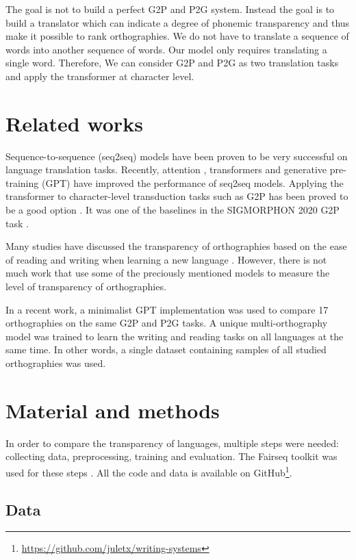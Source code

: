 \documentclass[11pt,a4paper]{article}
\begin{document}
The goal is not to build a perfect G2P and P2G system. Instead the goal is to build a translator which can indicate a degree of phonemic transparency and thus make it possible to rank orthographies. We do not have to translate a
sequence of words into another sequence of words. Our model only requires translating a single word. Therefore, We can consider G2P and P2G as two translation tasks and apply the transformer at character level.

\section{Related works}

Sequence-to-sequence (seq2seq) models have been proven to be very successful on language translation tasks. Recently, attention \cite{bahdanau2016neural}, transformers \cite{vaswani2017attention} and generative pre-training (GPT) \cite{Radford2018ImprovingLU} have improved the performance of seq2seq models. Applying the transformer to character-level transduction tasks such as G2P has been proved to be a good option \cite{wu2021applying}. It was one of the baselines in the SIGMORPHON 2020 G2P task \cite{gorman-etal-2020-sigmorphon}.

Many studies have discussed the transparency of orthographies based on the ease of reading and writing when learning a new language \cite{borleffs2017measuring}. However, there is not much work that use some of the preciously mentioned models to measure the level of transparency of orthographies.

In a recent work, a minimalist GPT implementation was used to compare 17 orthographies \cite{marjou2021oteann} on the same G2P and P2G tasks. A unique multi-orthography model was trained to learn the writing and reading tasks on all languages at the same time. In other words, a single dataset containing samples of all studied orthographies was used.

\section{Material and methods}

In order to compare the transparency of languages, multiple steps were needed: collecting data, preprocessing, training and evaluation. The Fairseq toolkit was used for these steps \cite{ott2019fairseq}. All the code and data is available on GitHub\footnote{\url{https://github.com/juletx/writing-systems}}.

\subsection{Data}
\end{document}

